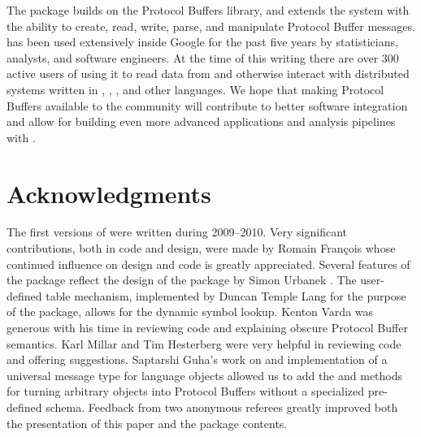 \documentclass[article]{jss}
\begin{document}
The  package builds on the Protocol Buffers
 library, and extends the  system with the
ability to create, read, write, parse, and manipulate Protocol Buffer
messages.  has been used extensively inside Google for
the past five years by statisticians, analysts, and software
engineers.  At the time of this writing there are over 300 active
users of  using it to read data from and otherwise
interact with distributed systems written in ,
, , and other languages. We hope that
making Protocol Buffers available to the  community will
contribute to better software integration and allow for building even
more advanced applications and analysis pipelines with .

\section*{Acknowledgments}

The first versions of  were written during 2009--2010.
Very significant contributions, both in code and design, were made by
Romain Fran\c{c}ois whose continued influence on design and code is
greatly appreciated. Several features of the package reflect the
design of the  package by Simon Urbanek \citep{rjava}.  The
user-defined table mechanism, implemented by Duncan Temple Lang for
the purpose of the  package, allows for the dynamic
symbol lookup.  Kenton Varda was generous with his time in reviewing
code and explaining obscure Protocol Buffer semantics.  Karl Millar
and Tim Hesterberg were very helpful in reviewing code and offering
suggestions.  Saptarshi Guha's work on  and implementation
of a universal message type for  language objects allowed
us to add the  and  methods
for turning arbitrary  objects into Protocol Buffers
without a specialized pre-defined schema.  Feedback from two anonymous
referees greatly improved both the presentation of this paper and the
package contents.


\end{document}

